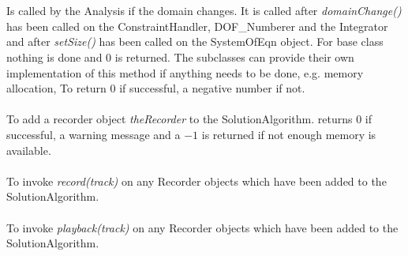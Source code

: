   \\
 \\
Is called by the Analysis if the domain changes. It is called after
{\em domainChange()} has been called on the ConstraintHandler,
DOF\_Numberer and the Integrator and after {\em setSize()} has been
called on the SystemOfEqn object. For base class nothing is done and
$0$ is returned. The subclasses can provide their own implementation
of this method if anything needs to be done, e.g. memory allocation,
To return $0$ if successful, a negative number if not. \\


\\
To add a recorder object {\em theRecorder} to the
SolutionAlgorithm. returns $0$ if successful, a warning message and a
$-1$ is returned if not enough memory is available. \\

 \\
To invoke {\em record(track)} on any Recorder objects which have been added to the
SolutionAlgorithm. \\

 \\
To invoke {\em playback(track)} on any Recorder objects which have been added to the
SolutionAlgorithm. \\
